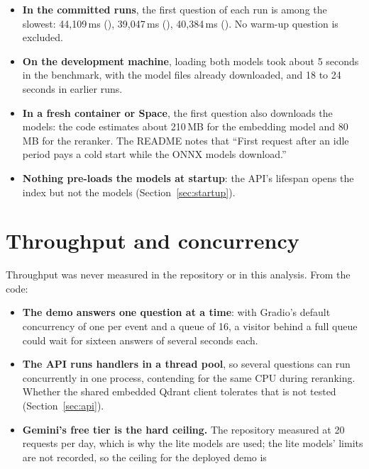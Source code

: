 \begin{itemize}
  \item \textbf{In the committed runs}, the first question of each run is among the slowest: 44,109\,ms (), 39,047\,ms (), 40,384\,ms (). No warm-up question is excluded.
  \item \textbf{On the development machine}, loading both models took about 5 seconds in the benchmark, with the model files already downloaded, and 18 to 24 seconds in earlier runs.
  \item \textbf{In a fresh container or Space}, the first question also downloads the models: the code estimates about 210\,MB for the embedding model and 80\,MB for the reranker. The README notes that \enquote{First request after an idle period pays a cold start while the ONNX models download.}
  \item \textbf{Nothing pre-loads the models at startup}: the API's lifespan opens the index but not the models (Section~\ref{sec:startup}).
\end{itemize}

\section{Throughput and concurrency}

Throughput was never measured in the repository or in this analysis. From the code:

\begin{inferred}
\begin{itemize}
  \item \textbf{The demo answers one question at a time}: with Gradio's default concurrency of one per event and a queue of 16, a visitor behind a full queue could wait for sixteen answers of several seconds each.
  \item \textbf{The API runs handlers in a thread pool}, so several questions can run concurrently in one process, contending for the same CPU during reranking. Whether the shared embedded Qdrant client tolerates that is not tested (Section~\ref{sec:api}).
  \item \textbf{Gemini's free tier is the hard ceiling.} The repository measured  at 20 requests per day, which is why the lite models are used; the lite models' limits are not recorded, so the ceiling for the deployed demo is \NotDet
\end{itemize}
\end{inferred}

